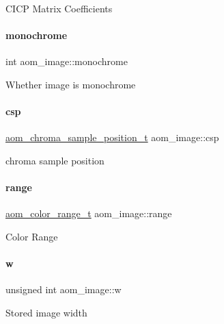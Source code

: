 C\+I\+CP Matrix Coefficients \mbox{\label{structaom__image_ab7886616025ff8bd0bb96d967fca9ad8}} 
\paragraph{\texorpdfstring{monochrome}{monochrome}}
{\footnotesize\ttfamily int aom\+\_\+image\+::monochrome}

Whether image is monochrome \mbox{\label{structaom__image_a4f235c521bc95a061e9e0b2a3d5d457e}} 
\paragraph{\texorpdfstring{csp}{csp}}
{\footnotesize\ttfamily \hyperlink{aom__image_8h_a48f259fc7774b1c799b3ebe7530c19bd}{aom\+\_\+chroma\+\_\+sample\+\_\+position\+\_\+t} aom\+\_\+image\+::csp}

chroma sample position \mbox{\label{structaom__image_abcab05cb3e14a6391b9758f1954160d6}} 
\paragraph{\texorpdfstring{range}{range}}
{\footnotesize\ttfamily \hyperlink{aom__image_8h_ab7754f796b26c07a78bb338b38f8df67}{aom\+\_\+color\+\_\+range\+\_\+t} aom\+\_\+image\+::range}

Color Range \mbox{\label{structaom__image_a695141e492ab146dc15e8131827eb237}} 
\paragraph{\texorpdfstring{w}{w}}
{\footnotesize\ttfamily unsigned int aom\+\_\+image\+::w}

Stored image width \mbox{\label{structaom__image_a3fcffff0a25a4fd9218ed38842014ef2}} 
